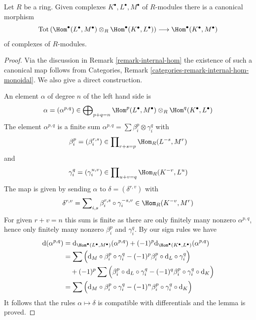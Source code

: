 \begin{lemma}
\label{lemma-composition}
Let $R$ be a ring. Given complexes
$K^\bullet, L^\bullet, M^\bullet$
of $R$-modules there is a canonical morphism
$$
\text{Tot}\left(
\Hom^\bullet(L^\bullet, M^\bullet) \otimes_R \Hom^\bullet(K^\bullet, L^\bullet)
\right)
\longrightarrow
\Hom^\bullet(K^\bullet, M^\bullet)
$$
of complexes of $R$-modules.
\end{lemma}

\begin{proof}
Via the discussion in Remark \ref{remark-internal-hom} the existence
of such a canonical map follows from
Categories, Remark \ref{categories-remark-internal-hom-monoidal}.
We also give a direct construction.

\medskip\noindent
An element $\alpha$ of degree $n$ of the left hand side is
$$
\alpha = (\alpha^{p, q}) \in \bigoplus\nolimits_{p + q = n}
\Hom^p(L^\bullet, M^\bullet) \otimes_R \Hom^q(K^\bullet, L^\bullet)
$$
The element $\alpha^{p, q}$ is a finite sum
$\alpha^{p, q} = \sum \beta^p_i \otimes \gamma^q_i$
with
$$
\beta^p_i = (\beta^{r, s}_i)
\in \prod\nolimits_{r + s = p} \Hom_R(L^{-s}, M^r)
$$
and
$$
\gamma^q_i = (\gamma^{u, v}_i)
\in \prod\nolimits_{u + v = q} \Hom_R(K^{-v}, L^u)
$$
The map is given by sending $\alpha$ to
$\delta = (\delta^{r, v})$ with
$$
\delta^{r, v} =
\sum\nolimits_{i, s}  \beta^{r, s}_i
\circ \gamma^{-s, v}_i
\in \Hom_R(K^{-v}, M^r)
$$
For given $r + v = n$ this sum is finite as there are only finitely many
nonzero $\alpha^{p, q}$, hence only finitely many nonzero
$\beta^p_i$ and $\gamma^q_i$.
By our sign rules we have
\begin{align*}
\text{d}(\alpha^{p, q})
& =
\text{d}_{\Hom^\bullet(L^\bullet, M^\bullet)}(\alpha^{p, q})
+ (-1)^p \text{d}_{\Hom^\bullet(K^\bullet, L^\bullet)}(\alpha^{p, q}) \\
& =
\sum \Big( \text{d}_M \circ \beta^p_i \circ \gamma^q_i
- (-1)^p \beta^p_i \circ \text{d}_L \circ \gamma^q_i \Big) \\
&
\quad + (-1)^p \sum \Big( \beta^p_i \circ \text{d}_L \circ \gamma^q_i
- (-1)^q \beta^p_i \circ \gamma^q_i \circ \text{d}_K \Big) \\
& =
\sum \Big( \text{d}_M \circ \beta^p_i \circ \gamma^q_i 
-(-1)^n \beta^p_i \circ \gamma^q_i \circ \text{d}_K \Big)
\end{align*}
It follows that the rules $\alpha \mapsto \delta$ is compatible
with differentials and the lemma is proved.
\end{proof}

